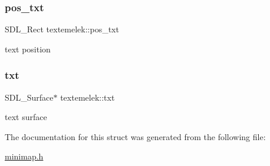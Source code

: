 \subsubsection{\texorpdfstring{pos\+\_\+txt}{pos\_txt}}
{\footnotesize\ttfamily S\+D\+L\+\_\+\+Rect textemelek\+::pos\+\_\+txt}

text position \mbox{\label{structtextemelek_a6f903817cfb262dfe44ace959683da71}} 
\subsubsection{\texorpdfstring{txt}{txt}}
{\footnotesize\ttfamily S\+D\+L\+\_\+\+Surface$\ast$ textemelek\+::txt}

text surface 

The documentation for this struct was generated from the following file\+:\begin{DoxyCompactItemize}
\item 
\hyperlink{minimap_8h}{minimap.\+h}\end{DoxyCompactItemize}
